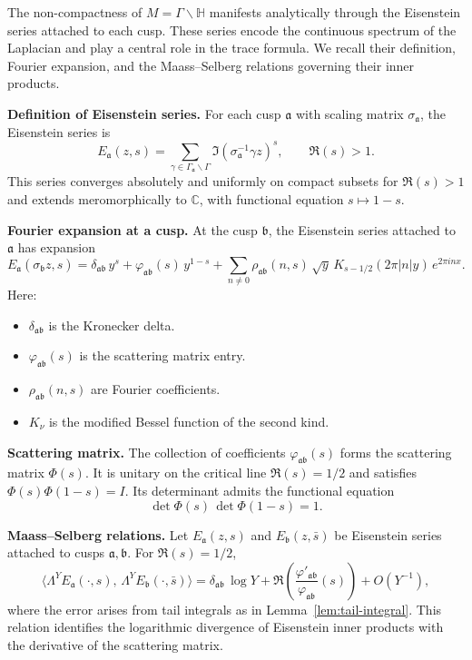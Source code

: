 The non-compactness of $M=\Gamma\backslash\mathbb{H}$ manifests analytically
through the Eisenstein series attached to each cusp.
These series encode the continuous spectrum of the Laplacian
and play a central role in the trace formula.
We recall their definition, Fourier expansion,
and the Maass–Selberg relations governing their inner products.

\medskip
\noindent
\textbf{Definition of Eisenstein series.}
For each cusp $\mathfrak{a}$ with scaling matrix $\sigma_{\mathfrak{a}}$,
the Eisenstein series is
\[
  E_{\mathfrak{a}}(z,s)
  = \sum_{\gamma \in \Gamma_{\mathfrak{a}}\backslash\Gamma}
    \Im(\sigma_{\mathfrak{a}}^{-1}\gamma z)^{s}, \qquad \Re(s)>1.
\]
This series converges absolutely and uniformly on compact subsets
for $\Re(s)>1$ and extends meromorphically to $\mathbb{C}$,
with functional equation $s \mapsto 1-s$.

\medskip
\noindent
\textbf{Fourier expansion at a cusp.}
At the cusp $\mathfrak{b}$, the Eisenstein series attached to $\mathfrak{a}$
has expansion
\[
  E_{\mathfrak{a}}(\sigma_{\mathfrak{b}} z, s)
  = \delta_{\mathfrak{a}\mathfrak{b}}\, y^{s}
    + \varphi_{\mathfrak{a}\mathfrak{b}}(s)\, y^{1-s}
    + \sum_{n\neq 0}
      \rho_{\mathfrak{a}\mathfrak{b}}(n,s)\,
      \sqrt{y}\, K_{s-1/2}(2\pi |n|y)\, e^{2\pi i n x}.
\]
Here:
\begin{itemize}
  \item $\delta_{\mathfrak{a}\mathfrak{b}}$ is the Kronecker delta.
  \item $\varphi_{\mathfrak{a}\mathfrak{b}}(s)$ is the scattering matrix entry.
  \item $\rho_{\mathfrak{a}\mathfrak{b}}(n,s)$ are Fourier coefficients.
  \item $K_{\nu}$ is the modified Bessel function of the second kind.
\end{itemize}

\medskip
\noindent
\textbf{Scattering matrix.}
The collection of coefficients $\varphi_{\mathfrak{a}\mathfrak{b}}(s)$
forms the scattering matrix $\Phi(s)$.
It is unitary on the critical line $\Re(s)=1/2$ and satisfies
$\Phi(s)\Phi(1-s)=I$.
Its determinant admits the functional equation
\[
  \det \Phi(s)\,\det \Phi(1-s) = 1.
\]

\medskip
\noindent
\textbf{Maass–Selberg relations.}
Let $E_{\mathfrak{a}}(z,s)$ and $E_{\mathfrak{b}}(z,\bar{s})$ be Eisenstein
series attached to cusps $\mathfrak{a},\mathfrak{b}$.
For $\Re(s)=1/2$,
\[
  \langle \Lambda^{Y} E_{\mathfrak{a}}(\cdot,s),\,
          \Lambda^{Y} E_{\mathfrak{b}}(\cdot,\bar{s}) \rangle
  = \delta_{\mathfrak{a}\mathfrak{b}} \,\log Y
    + \Re\!\left(\frac{\varphi'_{\mathfrak{a}\mathfrak{b}}}{\varphi_{\mathfrak{a}\mathfrak{b}}}(s)\right)
    + O(Y^{-1}),
\]
where the error arises from tail integrals as in Lemma~\ref{lem:tail-integral}.
This relation identifies the logarithmic divergence of Eisenstein inner products
with the derivative of the scattering matrix.

